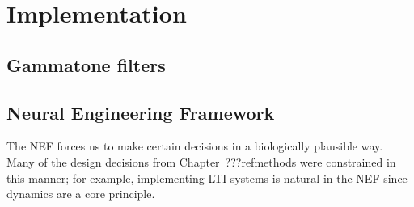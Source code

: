 \chapter{Implementation}



\section{Gammatone filters}

\section{Neural Engineering Framework}

The NEF forces us to make certain decisions
in a biologically plausible way.
Many of the design decisions from Chapter~???refmethods
were constrained in this manner;
for example, implementing LTI systems is natural
in the NEF since dynamics are a core principle.
